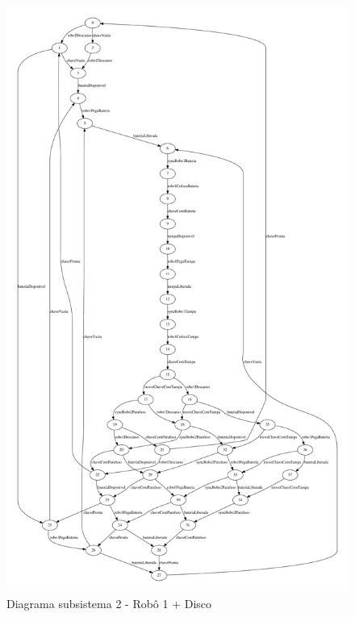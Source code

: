 \documentclass[a4paper,11pt,twocolumns]{article}
\begin{document}
\newpage
\begin{figure}[H]
    \centering
    \includegraphics[height = 0.95\textheight]{./img/g_sistema2.pdf}
    \caption{Diagrama subsistema 2 - Robô 1 + Disco}
    \label{fig:g_subsis2}
\end{figure}
\end{document}
